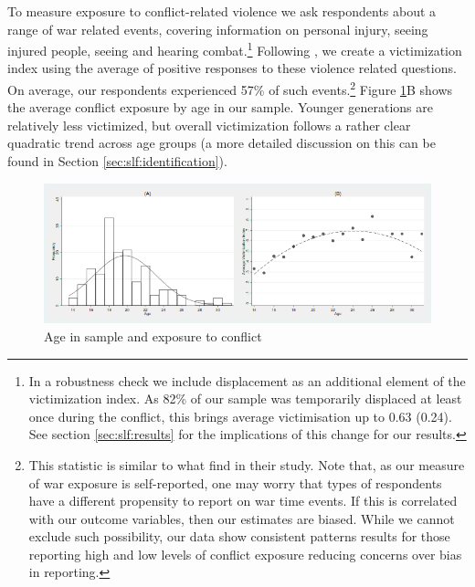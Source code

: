 To measure exposure to conflict-related violence we ask respondents about a range of war related events, covering information on personal injury, seeing injured people, seeing and hearing combat.\footnote{In a robustness check we include displacement as an additional element of the victimization index. As 82\% of our sample was temporarily displaced at least once during the conflict, this brings average victimisation up to 0.63 (0.24). See section \ref{sec:slf:results} for the implications of this change for our results.} Following \cite{Bellows2009b}, we create a victimization index using the average of positive responses to these violence related questions. On average, our respondents experienced 57\% of such events.\footnote{This statistic is similar to what \citet{Bellows2009b} find in their study. Note that, as our measure of war exposure is self-reported, one may worry that types of respondents have a different propensity to report on war time events. If this is correlated with our outcome variables, then our estimates are biased. While we cannot exclude such possibility, our data show consistent patterns results for those reporting high and low levels of conflict exposure reducing concerns over bias in reporting.}  Figure \ref{fig:slf:ageconflict}B shows the average conflict exposure by age in our sample. Younger generations are relatively less victimized, but overall victimization follows a rather clear quadratic trend across age groups (a more detailed discussion on this can be found in Section \ref{sec:slf:identification}).

\begin{figure}[htb]
  \includegraphics[width=0.8\linewidth]{"chapters/slfootball/figures/f2_agefreq_agewe.png"}
  \caption{Age in sample and exposure to conflict}
  \label{fig:slf:ageconflict}
\end{figure}

